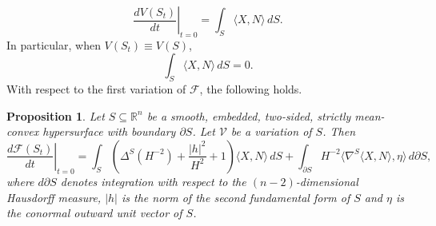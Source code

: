 \documentclass[11pt]{amsart}
\newcommand{\F}{\mathcal F}
\newcommand{\rr}{{\mathbb{R}}}
\newtheorem{proposition}[theorem]{Proposition}
\theoremstyle{definition}
\theoremstyle{remark}
\numberwithin{equation}{section}
\begin{document}
	\begin{equation}\label{firstvarvol}
		\left. \frac{dV(S_t)}{dt}\right|_{t=0}=\int_S\langle X,N\rangle\,dS.
	\end{equation}
	In particular, when $V(S_t)\equiv V(S)$,
	\begin{equation}\label{vpthenfovp}
		\int_S\langle X,N\rangle\,dS=0.
	\end{equation}
	With respect to the first variation of $\F$, the following holds.
	\begin{proposition}\label{firstvariationofimc}
		Let $S\subseteq\rr^n$ be a smooth, embedded, two-sided, strictly mean-convex hypersurface with boundary $\partial S$. Let $\mathcal V$ be a variation of $S$. Then
		\begin{equation}\label{firsvarformulageneral}
			\left.\frac{d\F(S_t)}{dt}\right|_{t=0}=\int_S\left(\Delta^S(H^{-2})+\frac{|h|^2}{H^2}+1\right)\langle X,N\rangle\,dS+ \int_{\partial S}H^{-2}\langle\nabla^S\langle X,N\rangle,\eta\rangle\,d\partial S,
		\end{equation}
		where $d\partial S$ denotes integration with respect to the $(n-2)$-dimensional Hausdorff measure, $|h|$ is the norm of the second fundamental form of $S$ and $\eta$ is the conormal outward unit vector of $S$.
	\end{proposition}
\end{document}
